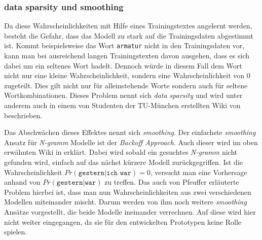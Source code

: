     \subsubsection*{data sparsity und smoothing}
        
    Da diese Wahrscheinlichkeiten mit Hilfe eines Trainingstextes angelernt werden, besteht die Gefahr, dass das Modell zu stark auf die Trainingsdaten abgestimmt ist. Kommt beispielsweise das Wort \texttt{armatur} nicht in den Trainingsdaten vor, kann man bei ausreichend langen Trainingstexten davon ausgehen, dass es sich dabei um ein seltenes Wort hadelt. Dennoch würde in diesem Fall dem Wort nicht nur eine kleine Wahrscheinlichkeit, sondern eine Wahrscheinlichkeit von 0 zugeteilt. Dies gilt nicht nur für alleinstehende Worte sondern auch für seltene Wortkombinationen. Dieses Problem nennt sich \emph{data sparsity} und wird unter anderem auch in einem von Studenten der TU-München erstellten Wiki von \parencite[Abs. 5]{recognize-speech:n-gramms} beschrieben. 
        
    Das Abschwächen dieses Effektes nennt sich \emph{smoothing}. Der einfachste \emph{smoothing} Ansatz für \emph{N-gramm} Modelle ist der \emph{Backoff Approach}. Auch dieser wird im oben erwähnten Wiki in \parencite{recognize-speech:backoff} erklärt. Dabei wird sobald ein gesuchtes \emph{N-gramm} nicht gefunden wird, einfach auf das nächst kürzere Modell zurückgegriffen. Ist die Wahrscheinlichkeit \(Pr(\texttt{gestern}|\texttt{ich war}) = 0\), versucht man eine Vorhersage anhand von \(Pr(\texttt{gestern}|\texttt{war})\) zu treffen. Das auch von Pfeuffer erläuterte Problem hierbei ist, dass man nun Wahrscheinlichkeiten aus zwei verschiedenen Modellen miteinander mischt. Darum werden von ihm noch weitere \emph{smoothing} Ansätze vorgestellt, die beide Modelle ineinander verrechnen. Auf diese wird hier nicht weiter eingegangen, da sie für den entwickelten Prototypen keine Rolle spielen.